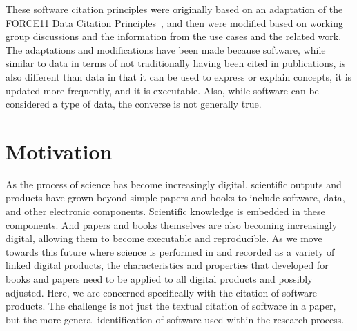 \documentclass[11pt, oneside]{amsart}
\newcommand{\katznote}[1]{ {\textcolor{blue} { ***DSK: #1 }}} %
\begin{document}
These software citation principles were originally based on an adaptation of the FORCE11 Data Citation Principles~\cite{data-citation-principles}, and then were modified based on working group discussions and the information from the use cases and the related work.
The adaptations and modifications have been made because software, while similar to data in terms of not traditionally having been cited in publications, is also different than data in that it can be used to express or explain concepts, it is updated more frequently, and it is executable.
Also, while software can be considered a type of data, the converse is not generally true.



\section{Motivation}
\label{sec:intro}

As the process of science has become increasingly digital, scientific outputs and products have
grown beyond simple papers and books to include software, data, and other electronic
components.  Scientific knowledge is embedded in these components.  And papers and books
themselves are also becoming increasingly digital, allowing them to become executable
and reproducible.  As we move towards this future where science is performed in and recorded
as a variety of linked digital products, the characteristics and properties that developed for
books and papers need to be applied to all digital products and possibly adjusted.  Here, we are concerned specifically
with the citation of software products.  The challenge is not just the textual citation of software in a paper, but the more general identification of software used within the research process.
\end{document}

